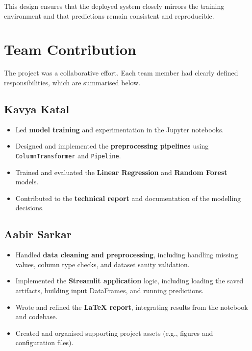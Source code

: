 \documentclass[11pt,a4paper]{article}
\begin{document}
This design ensures that the deployed system closely mirrors the training environment and that predictions remain consistent and reproducible.

\section{Team Contribution}

The project was a collaborative effort. Each team member had clearly defined responsibilities, which are summarised below.

\subsection*{Kavya Katal}

\begin{itemize}[leftmargin=*]
    \item Led \textbf{model training} and experimentation in the Jupyter notebooks.
    \item Designed and implemented the \textbf{preprocessing pipelines} using \texttt{ColumnTransformer} and \texttt{Pipeline}.
    \item Trained and evaluated the \textbf{Linear Regression} and \textbf{Random Forest} models.
    \item Contributed to the \textbf{technical report} and documentation of the modelling decisions.
\end{itemize}

\subsection*{Aabir Sarkar}

\begin{itemize}[leftmargin=*]
    \item Handled \textbf{data cleaning and preprocessing}, including handling missing values, column type checks, and dataset sanity validation.
    \item Implemented the \textbf{Streamlit application} logic, including loading the saved artifacts, building input DataFrames, and running predictions.
    \item Wrote and refined the \textbf{LaTeX report}, integrating results from the notebook and codebase.
    \item Created and organised supporting project assets (e.g., figures and configuration files).
\end{itemize}
\end{document}
